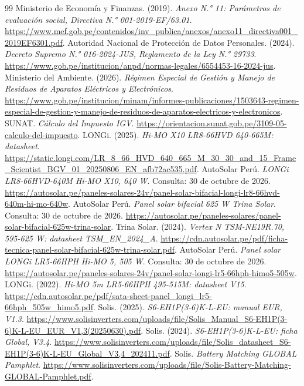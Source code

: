 \begin{thebibliography}{99}
 Ministerio de Economía y Finanzas. (2019). \emph{Anexo N.° 11: Parámetros de evaluación social, Directiva N.° 001-2019-EF/63.01}. \url{https://www.mef.gob.pe/contenidos/inv_publica/anexos/anexo11_directiva001_2019EF6301.pdf}.
 Autoridad Nacional de Protección de Datos Personales. (2024). \emph{Decreto Supremo N.° 016-2024-JUS, Reglamento de la Ley N.° 29733}. \url{https://www.gob.pe/institucion/anpd/normas-legales/6554453-16-2024-jus}.
 Ministerio del Ambiente. (2026). \emph{Régimen Especial de Gestión y Manejo de Residuos de Aparatos Eléctricos y Electrónicos}. \url{https://www.gob.pe/institucion/minam/informes-publicaciones/1503643-regimen-especial-de-gestion-y-manejo-de-residuos-de-aparatos-electricos-y-electronicos}.
 SUNAT. \emph{Cálculo del Impuesto IGV}. \url{https://orientacion.sunat.gob.pe/3109-05-calculo-del-impuesto}.
 LONGi. (2025). \emph{Hi-MO X10 LR8-66HVD 640-665M: datasheet}. \url{https://static.longi.com/LR_8_66_HVD_640_665_M_30_30_and_15_Frame_Scientist_BGV_01_20250806_EN_afb72ac535.pdf}.
 AutoSolar Perú. \emph{LONGi LR8-66HVD-640M Hi-MO X10, 640 W}. Consulta: 30 de octubre de 2026. \url{https://autosolar.pe/paneles-solares-24v/panel-solar-bifacial-longi-lr8-66hvd-640m-hi-mo-640w}.
 AutoSolar Perú. \emph{Panel solar bifacial 625 W Trina Solar}. Consulta: 30 de octubre de 2026. \url{https://autosolar.pe/paneles-solares/panel-solar-bifacial-625w-trina-solar}.
 Trina Solar. (2024). \emph{Vertex N TSM-NE19R.70, 595-625 W: datasheet TSM\_EN\_2024\_A}. \url{https://cdn.autosolar.pe/pdf/ficha-tecnica-panel-solar-bifacial-625w-trina-solar.pdf}.
 AutoSolar Perú. \emph{Panel solar LONGi LR5-66HPH Hi-MO 5, 505 W}. Consulta: 30 de octubre de 2026. \url{https://autosolar.pe/paneles-solares-24v/panel-solar-longi-lr5-66hph-himo5-505w}.
 LONGi. (2022). \emph{Hi-MO 5m LR5-66HPH 495-515M: datasheet V15}. \url{https://cdn.autosolar.pe/pdf/sata-sheet-panel_longi_lr5-66hph_505w_himo5.pdf}.
 Solis. (2025). \emph{S6-EH1P(3-6)K-L-EU: manual EUR, V1.3}. \url{https://www.solisinverters.com/uploads/file/Solis_Manual_S6-EH1P(3-6)K-L-EU_EUR_V1,3(20250630).pdf}.
 Solis. (2024). \emph{S6-EH1P(3-6)K-L-EU: ficha Global, V3.4}. \url{https://www.solisinverters.com/uploads/file/Solis_datasheet_S6-EH1P(3-6)K-L-EU_Global_V3,4_202411.pdf}.
 Solis. \emph{Battery Matching GLOBAL Pamphlet}. \url{https://www.solisinverters.com/uploads/file/Solis-Battery-Matching-GLOBAL-Pamphlet.pdf}.

\end{thebibliography}
